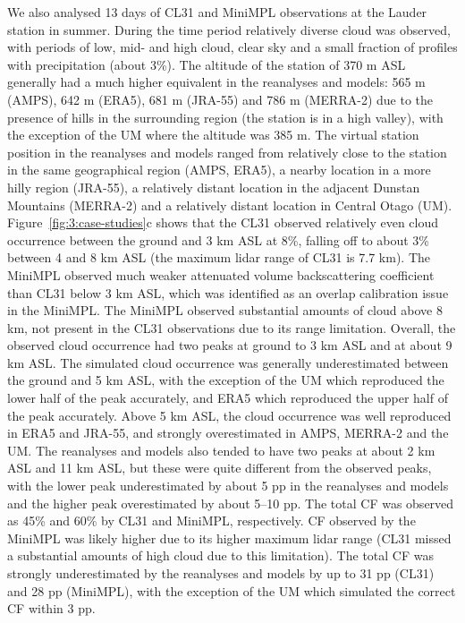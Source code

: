 We also analysed 13 days of CL31 and MiniMPL observations at the Lauder station
in summer. During the time period relatively diverse cloud was observed,
with periods of low, mid- and high cloud, clear sky and a small fraction
of profiles with precipitation (about 3\%). The altitude of the station of 370 m
ASL generally had a much higher equivalent in the reanalyses and models:
565 m (AMPS), 642 m (ERA5), 681 m (JRA-55) and 786 m (MERRA-2) due to the
presence of hills in the surrounding region (the station is in a high valley),
with the exception of the UM where the altitude was 385 m. The virtual station position in the
reanalyses and models ranged from relatively close to the station in the same
geographical region (AMPS, ERA5), a nearby location in a more hilly region
(JRA-55), a relatively distant location in the adjacent Dunstan Mountains
(MERRA-2) and a relatively distant location in Central Otago (UM).
Figure~\ref{fig:3:case-studies}c shows that the CL31 observed relatively even cloud occurrence between the ground
and 3 km ASL at 8\%, falling off to about 3\% between 4 and 8 km ASL
(the maximum lidar range of CL31 is 7.7 km). The MiniMPL observed much weaker
attenuated volume backscattering coefficient than CL31 below 3 km ASL, which was identified as an overlap
calibration issue in the MiniMPL.
The MiniMPL observed
substantial amounts of cloud above 8 km, not present in the CL31 observations
due to its range limitation. Overall, the observed cloud occurrence had two
peaks at ground to 3 km ASL and at about 9 km ASL. The simulated cloud
occurrence was generally underestimated between the ground and 5 km ASL,
with the exception of the UM which reproduced the lower half of the peak
accurately, and ERA5 which reproduced the upper half of the peak accurately.
Above 5 km ASL, the cloud occurrence was well reproduced in ERA5 and JRA-55,
and strongly overestimated in AMPS, MERRA-2 and the UM. The reanalyses and models also
tended to have two peaks at about 2 km ASL and 11 km ASL, but these were quite
different from the observed peaks, with the lower peak underestimated by about
5 pp in the reanalyses and models and the higher peak overestimated by about 5--10 pp.
The total CF was observed as 45\% and 60\% by CL31 and MiniMPL, respectively.
CF observed by the MiniMPL was likely higher due to its higher maximum lidar range
(CL31 missed a substantial amounts of high cloud due to this limitation).
The total CF was strongly underestimated by the reanalyses and models
by up to 31 pp (CL31) and 28 pp (MiniMPL), with the exception of the UM
which simulated the correct CF within 3 pp.

